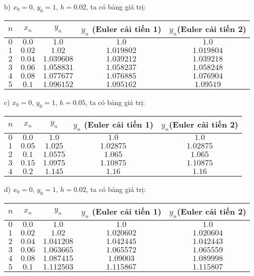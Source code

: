 b) $x_0=0$, $y_0=1$, $h=0.02$, ta có bảng giá trị:
\begin{longtable}{|c|c|c|c|c|}\hline
	$n$ & $x_n$ & $y_n$ & $y_n$ (Euler cải tiến 1) & $y_n$(Euler cải tiến 2) \\ \hline
	\endhead
	$0$ & $0.0$ & $1.0$ & $1.0$ & $1.0$ \\ \hline
	$1$ & $0.02$ & $1.02$ & $1.019802$ & $1.019804$ \\ \hline
	$2$ & $0.04$ & $1.039608$ & $1.039212$ & $1.039218$ \\ \hline
	$3$ & $0.06$ & $1.058831$ & $1.058237$ & $1.058248$ \\ \hline
	$4$ & $0.08$ & $1.077677$ & $1.076885$ & $1.076904$ \\ \hline
	$5$ & $0.1$ & $1.096152$ & $1.095162$ & $1.09519$ \\ \hline
\end{longtable}

c) $x_0=0$, $y_0=1$, $h=0.05$, ta có bảng giá trị:
\begin{longtable}{|c|c|c|c|c|}\hline
	$n$ & $x_n$ & $y_n$ & $y_n$ (Euler cải tiến 1) & $y_n$(Euler cải tiến 2) \\ \hline
	\endhead
	$0$ & $0.0$ & $1.0$ & $1.0$ & $1.0$ \\ \hline
	$1$ & $0.05$ & $1.025$ & $1.02875$ & $1.02875$ \\ \hline
	$2$ & $0.1$ & $1.0575$ & $1.065$ & $1.065$ \\ \hline
	$3$ & $0.15$ & $1.0975$ & $1.10875$ & $1.10875$ \\ \hline
	$4$ & $0.2$ & $1.145$ & $1.16$ & $1.16$ \\ \hline
\end{longtable}

d) $x_0=0$, $y_0=1$, $h=0.02$, ta có bảng giá trị:
\begin{longtable}{|c|c|c|c|c|}\hline
	$n$ & $x_n$ & $y_n$ & $y_n$ (Euler cải tiến 1) & $y_n$(Euler cải tiến 2) \\ \hline
	\endhead
	$0$ & $0.0$ & $1.0$ & $1.0$ & $1.0$ \\ \hline
	$1$ & $0.02$ & $1.02$ & $1.020602$ & $1.020604$ \\ \hline
	$2$ & $0.04$ & $1.041208$ & $1.042445$ & $1.042443$ \\ \hline
	$3$ & $0.06$ & $1.063665$ & $1.065572$ & $1.065559$ \\ \hline
	$4$ & $0.08$ & $1.087415$ & $1.09003$ & $1.089998$ \\ \hline
	$5$ & $0.1$ & $1.112503$ & $1.115867$ & $1.115807$ \\ \hline
\end{longtable}

